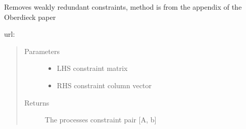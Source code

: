 \documentclass[letterpaper,10pt,english]{sphinxmanual}
\begin{document}
\begin{fulllineitems}
\label{\detokenize{ppopt.utils:ppopt.utils.constraint_utilities.calculate_redundant_constraints}}
\sphinxAtStartPar
Removes weakly redundant constraints, method is from the appendix of the Oberdieck paper

\sphinxAtStartPar
url: 
\begin{quote}\begin{description}
\item[{Parameters}] \leavevmode\begin{itemize}
\item {} 
\sphinxAtStartPar
{} \textendash{} LHS constraint matrix

\item {} 
\sphinxAtStartPar
{} \textendash{} RHS constraint column vector

\end{itemize}

\item[{Returns}] \leavevmode
\sphinxAtStartPar
The processes constraint pair {[}A, b{]}

\end{description}\end{quote}

\end{fulllineitems}

\end{document}
